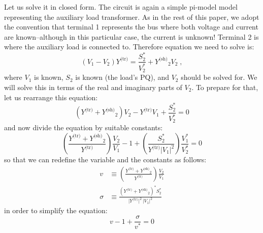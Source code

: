 \documentclass[a4paper,11pt]{article}
\providecommand{\abs}[1]{\lvert#1\rvert}
\newcommand{\Ytr}{\ensuremath{Y^{\textrm{(tr)}}}}
\newcommand{\Ysh}{\ensuremath{Y^{\textrm{(sh)}}}}
\begin{document}
Let us solve it in closed form. The circuit is again a simple pi-model model
representing the auxiliary load transformer.  As in the rest of this paper, we adopt the
convention that terminal 1 represents the bus where both voltage and current are
known--although in this particular case, the current is unknown!  Terminal 2 is where
the auxiliary load is connected to. Therefore equation we need to solve is:
\begin{equation*}
  (V_1 - V_2) \Ytr = \frac{S_2^*}{V_2^*} + \Ysh_2 V_2 \;,
\end{equation*}
where $V_1$ is known, $S_2$ is known (the load's PQ), and $V_2$ should be solved for. We
will solve this in terms of the real and imaginary parts of $V_2$. To prepare for that,
let us rearrange this equation:
\begin{equation*}
  (\Ytr + \Ysh_2) V_2 - \Ytr V_1  +  \frac{S_2^*}{V_2^*}  = 0
\end{equation*}
and now divide the equation by suitable constants:
\begin{equation*}
  \left( \frac{\Ytr + \Ysh_2}{\Ytr} \right) \frac{V_2}{V_1} - 1
  + \left( \frac{S_2^*}{\Ytr \abs{V_1}^2} \right) \frac{V_1^*}{V_2^*}  = 0
\end{equation*}
so that we can redefine the variable and the constants as follows:
\begin{equation}
  \label{eq:V2defs}
  \begin{split}
  v & \equiv \left( \frac{\Ytr + \Ysh_2}{\Ytr} \right) \frac{V_2}{V_1} \\
  \sigma & \equiv \frac{\left( \Ytr+\Ysh_2 \right)^* S_2^*}{\abs{\Ytr}^2 \, \abs{V_1}^2}
  \end{split}
\end{equation}
in order to simplify the equation:
\begin{equation}
  v - 1 + \frac{\sigma}{v^*}  = 0
\end{equation}
\end{document}
